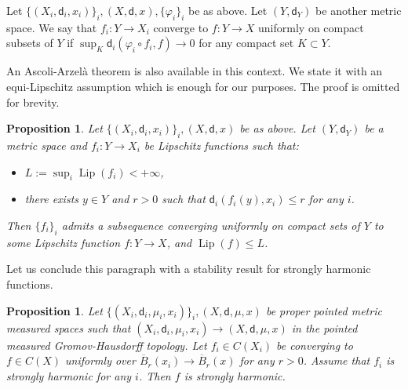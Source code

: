 \documentclass[10pt]{amsart}
\theoremstyle{plain}
\newtheorem{proposition}[theorem]{Proposition}
\theoremstyle{definition}
\let\phi\varphi
\DeclareMathOperator{\Lip}{Lip}
\newcommand{\dist}{\mathsf{d}}
\begin{document}
Let $\{(X_i,\dist_i,x_i)\}_i, (X,\dist,x),\{\phi_i\}_i$ be as above. Let $(Y,\dist_Y)$ be another metric space. We say that $f_i: Y\to X_i$ converge to $f: Y\to X$ uniformly on compact subsets of $Y$ if $\sup_K \dist_i(\phi_i \circ f_i,f) \to 0$ for any compact set $K \subset Y$.

An Ascoli-Arzelà theorem is also available in this context. We state it with an equi-Lipschitz assumption which is enough for our purposes. The proof is omitted for brevity.

\begin{proposition}\label{prop:AA2}
Let $\{(X_i,\dist_i,x_i)\}_i, (X,\dist,x)$ be as above. Let $(Y,\dist_Y)$ be a metric space and $f_i: Y\to X_i$ be Lipschitz functions such that:
\begin{itemize}
\item $L:=\sup_i \Lip(f_i) < +\infty$,
\item there exists $y\in Y$ and $r>0$ such that $\dist_i(f_i(y),x_i)\le r$ for any $i$.
\end{itemize} Then $\{f_i\}_i$ admits a subsequence converging uniformly on compact sets of $Y$ to some Lipschitz function $f:Y\to X$, and $\Lip(f) \le L$.
\end{proposition}

Let us conclude this paragraph with a stability result for strongly harmonic functions.

\begin{proposition}\label{prop:stabstrongharmonic}
Let $\{(X_i,\dist_i,\mu_i,x_i)\}_i, (X,\dist,\mu,x)$ be proper pointed metric measured spaces such that $(X_i,\dist_i,\mu_i,x_i) \to (X,\dist,\mu,x)$ in the pointed measured Gromov-Hausdorff topology. Let $f_i \in C(X_i)$ be converging to $f \in C(X)$ uniformly over $\overline{B}_r(x_i) \to \overline{B}_r(x)$ for any $r>0$. Assume that $f_i$ is strongly harmonic for any $i$. Then $f$ is strongly harmonic.
\end{proposition}
\end{document}
